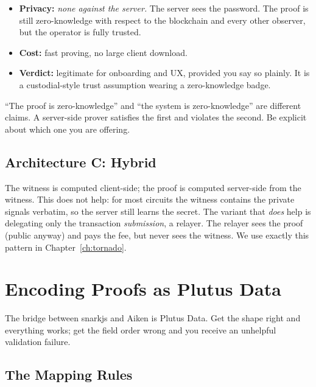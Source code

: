 \begin{itemize}
  \item \textbf{Privacy:} \emph{none against the server.} The server sees the
        password. The proof is still zero-knowledge with respect to the
        blockchain and every other observer, but the operator is fully trusted.
  \item \textbf{Cost:} fast proving, no large client download.
  \item \textbf{Verdict:} legitimate for onboarding and UX, provided you say so
        plainly. It is a custodial-style trust assumption wearing a
        zero-knowledge badge.
\end{itemize}

\begin{highlight}
``The proof is zero-knowledge'' and ``the system is zero-knowledge'' are
different claims. A server-side prover satisfies the first and violates the
second. Be explicit about which one you are offering.
\end{highlight}

\subsection*{Architecture C: Hybrid}

The witness is computed client-side; the proof is computed server-side from the
witness. This does not help: for most circuits the witness contains the private
signals verbatim, so the server still learns the secret. The variant that
\emph{does} help is delegating only the transaction \emph{submission}, a
relayer. The relayer sees the proof (public anyway) and pays the fee, but never
sees the witness. We use exactly this pattern in Chapter~\ref{ch:tornado}.

\section{Encoding Proofs as Plutus Data} \label{sec:ch7-encoding}

The bridge between snarkjs and Aiken is Plutus Data. Get the shape right and
everything works; get the field order wrong and you receive an unhelpful
validation failure.

\subsection*{The Mapping Rules}

